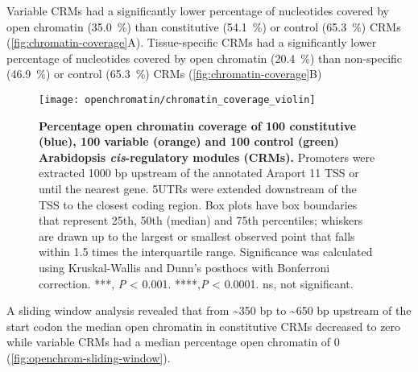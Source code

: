 \documentclass[../main.tex]{subfiles}
\begin{document}
Variable CRMs had a significantly lower percentage of nucleotides covered by open chromatin (\SI{35.0}{\percent}) than constitutive (\SI{54.1}{\percent}) or control (\SI{65.3}{\percent}) CRMs (\autoref{fig:chromatin-coverage}A). Tissue\hyp{}specific CRMs had a significantly lower percentage of nucleotides covered by open chromatin (\SI{20.4}{\percent}) than non\hyp{}specific (\SI{46.9}{\percent}) or control (\SI{65.3}{\percent}) CRMs (\autoref{fig:chromatin-coverage}B)

\begin{figure}[hbt!]
	\begin{center}
		\capstart
		\texttt{[image: openchromatin/chromatin\_coverage\_violin]}
		\caption{
			\textbf{Percentage open chromatin coverage of 100 constitutive (blue), 100 variable (orange) and 100 control (green) Arabidopsis \textit{cis}\hyp{}regulatory modules (CRMs).}
			Promoters were extracted 1000 bp upstream of the annotated Araport 11 \autocite{chengAraport11CompleteReannotation2017} TSS or until the nearest gene.
			5UTRs were extended downstream of the TSS to the closest coding region.
			Box plots have box boundaries that represent 25th, 50th (median) and 75th percentiles; whiskers are drawn up to the largest or smallest observed point that falls within 1.5 times the interquartile range.
			Significance was calculated using Kruskal\hyp{}Wallis and Dunn's posthocs with Bonferroni correction.
			***, \textit{P} \textless{} 0.001. ****,\textit{P} \textless{} 0.0001. ns, not significant.
			\label{fig:chromatin-coverage}
		}
	\end{center}
\end{figure}
A sliding window analysis revealed that from \textasciitilde{}350 bp to \textasciitilde{}650 bp upstream of the start codon the median open chromatin in constitutive CRMs decreased to zero while variable CRMs had a median percentage open chromatin of 0 (\autoref{fig:openchrom-sliding-window}).
\end{document}
